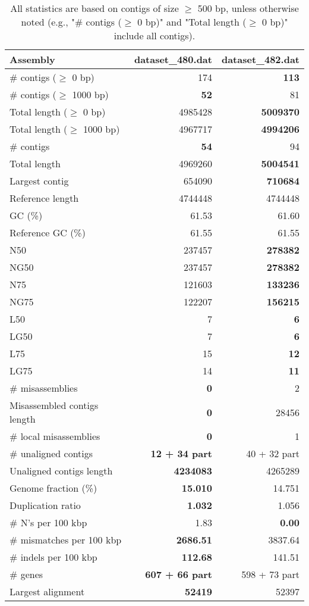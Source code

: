 \documentclass[12pt,a4paper]{article}
\begin{document}
\begin{table}[ht]
\begin{center}
\caption{All statistics are based on contigs of size $\geq$ 500 bp, unless otherwise noted (e.g., "\# contigs ($\geq$ 0 bp)" and "Total length ($\geq$ 0 bp)" include all contigs).}
\begin{tabular}{|l*{2}{|r}|}
\hline
Assembly & dataset\_480.dat & dataset\_482.dat \\ \hline
\# contigs ($\geq$ 0 bp) & 174 & {\bf 113} \\ \hline
\# contigs ($\geq$ 1000 bp) & {\bf 52} & 81 \\ \hline
Total length ($\geq$ 0 bp) & 4985428 & {\bf 5009370} \\ \hline
Total length ($\geq$ 1000 bp) & 4967717 & {\bf 4994206} \\ \hline
\# contigs & {\bf 54} & 94 \\ \hline
Total length & 4969260 & {\bf 5004541} \\ \hline
Largest contig & 654090 & {\bf 710684} \\ \hline
Reference length & 4744448 & 4744448 \\ \hline
GC (\%) & 61.53 & 61.60 \\ \hline
Reference GC (\%) & 61.55 & 61.55 \\ \hline
N50 & 237457 & {\bf 278382} \\ \hline
NG50 & 237457 & {\bf 278382} \\ \hline
N75 & 121603 & {\bf 133236} \\ \hline
NG75 & 122207 & {\bf 156215} \\ \hline
L50 & 7 & {\bf 6} \\ \hline
LG50 & 7 & {\bf 6} \\ \hline
L75 & 15 & {\bf 12} \\ \hline
LG75 & 14 & {\bf 11} \\ \hline
\# misassemblies & {\bf 0} & 2 \\ \hline
Misassembled contigs length & {\bf 0} & 28456 \\ \hline
\# local misassemblies & {\bf 0} & 1 \\ \hline
\# unaligned contigs & {\bf 12 + 34 part} & 40 + 32 part \\ \hline
Unaligned contigs length & {\bf 4234083} & 4265289 \\ \hline
Genome fraction (\%) & {\bf 15.010} & 14.751 \\ \hline
Duplication ratio & {\bf 1.032} & 1.056 \\ \hline
\# N's per 100 kbp & 1.83 & {\bf 0.00} \\ \hline
\# mismatches per 100 kbp & {\bf 2686.51} & 3837.64 \\ \hline
\# indels per 100 kbp & {\bf 112.68} & 141.51 \\ \hline
\# genes & {\bf 607 + 66 part} & 598 + 73 part \\ \hline
Largest alignment & {\bf 52419} & 52397 \\ \hline
\end{tabular}
\end{center}
\end{table}
\end{document}
